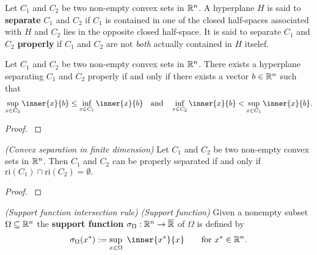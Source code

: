 \begin{definition}
\begin{definition}
  Let 
  $C_1$ and $C_2$
  be two non-empty convex sets in $\mathbb{R}^n$. 
  A hyperplane $H$ is said to \textbf{separate}
  $C_1$ and $C_2$
  if $C_1$ is contained in one of the closed half-spaces associated with
  $H$ and $C_2$ lies in the opposite closed half-space. It is said to separate 
  $C_1$ and $C_2$
  \textbf{properly} if 
  $C_1$ and $C_2$
  are not \textit{both} actually contained in $H$ itselef.
\end{definition}
\begin{theorem}
  Let $C_1$ and $C_2$ be two non-empty convex sets in $\mathbb{R}^n$. 
  There exists a hyperplane separating
  $C_1$ and $C_2$
  properly 
  if and only if
  there exists a vector $b\in \mathbb{R}^n$ such that
  \begin{gather}
    \sup_{x\in C_2} \inner{x}{b}
    \le
    \inf_{x\in C_1} \inner{x}{b}
    \quad 
    \text{and}
    \quad 
    \inf_{x\in C_2} \inner{x}{b}
    <
    \sup_{x\in C_1} \inner{x}{b}
    .
  \end{gather}
\end{theorem}
\begin{proof}
  \cite[Theorem~11.1]{Rockafellar1970}
\end{proof}
\begin{ftheorem}
  \emph{(Convex separation in finite dimension)}
  Let $C_1$ and $C_2$ be two non-empty convex sets in $\mathbb{R}^n$. 
  Then $C_1$ and $C_2$ can be properly separated if and only if 
  $\mathrm{ri}(C_1)\cap\mathrm{ri}(C_2)=\emptyset.$
\end{ftheorem}
\begin{proof}
  \cite[Theorem~11.3]{Rockafellar1970}
\end{proof}
\end{definition}
\begin{definition}
  \emph{(Support function intersection rule)}
  \emph{(Support function)}
  Given a nonempty subset 
  $\Omega \subseteq \mathbb{R}^n$
  the \textbf{support function} 
  $
  \sigma_\Omega : \mathbb{R}^n \to \overline{\mathbb{R}}
  $
  of $\Omega$
  is defined by
  \begin{gather}
    \sigma_\Omega
    (x^*)
    :=
    \sup_{x \in \Omega}
    \ 
    \inner{x^*}{x}
    \qquad
    \text{for}\ 
    x^* \in \R^n
    .
  \end{gather}
\end{definition}
